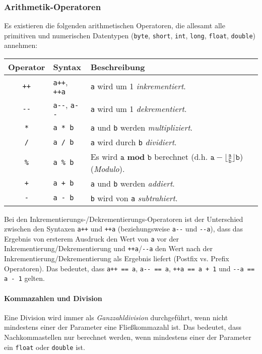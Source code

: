 	\subsubsection{Arithmetik-Operatoren}
		Es existieren die folgenden arithmetischen Operatoren, die allesamt alle primitiven und numerischen Datentypen (\lstinline|byte|, \lstinline|short|, \lstinline|int|, \lstinline|long|, \lstinline|float|, \lstinline|double|) annehmen:
		\begin{table}[H]
			\centering
			\begin{tabular}{c | l | l}
				\textbf{Operator} & \textbf{Syntax}                & \textbf{Beschreibung}                                    \\ \hline
				\texttt{++}       & \texttt{a++}, \texttt{++a}     & \texttt{a} wird um 1 \textit{inkrementiert}.             \\
				\texttt{-{}-}     & \texttt{a-{}-}, \texttt{a-{}-} & \texttt{a} wird um 1 \textit{dekrementiert}.             \\
				\texttt{*}        & \texttt{a * b}                 & \texttt{a} und \texttt{b} werden \textit{multipliziert}. \\
				\texttt{/}        & \texttt{a / b}                 & \texttt{a} wird durch \texttt{b} \textit{dividiert}.     \\
				\texttt{\%}       & \texttt{a \% b}                & Es wird \( \texttt{a} \textbf{ mod } \texttt{b} \) berechnet (d.h. \( \texttt{a} - \big\lfloor \frac{\texttt{a}}{\texttt{b}} \big\rfloor \texttt{b} \)) (\textit{Modulo}). \\
				\texttt{+}        & \texttt{a + b}                 & \texttt{a} und \texttt{b} werden \textit{addiert}.       \\
				\texttt{-}        & \texttt{a - b}                 & \texttt{b} wird von \texttt{a} \textit{subtrahiert}.
			\end{tabular}
		\end{table}
		Bei den Inkrementierungs-/Dekrementierungs-Operatoren ist der Unterschied zwischen den Syntaxen \texttt{a++} und \texttt{++a} (beziehungsweise \texttt{a-{}-} und \texttt{-{}-a}), dass das Ergebnis von ersterem Ausdruck den Wert von \texttt{a} vor der Inkrementierung/Dekrementierung und \texttt{++a}/\texttt{-{}-a} den Wert nach der Inkrementierung/Dekrementierung als Ergebnis liefert (Postfix vs. Prefix Operatoren). Das bedeutet, dass \texttt{a++ == a}, \texttt{a-{}- == a}, \texttt{++a == a + 1} und \texttt{-{}-a == a - 1} gelten.
		
		\paragraph{Kommazahlen und Division}
			Eine Division wird immer als \textit{Ganzzahldivision} durchgeführt, wenn nicht mindestens einer der Parameter eine Fließkommazahl ist. Das bedeutet, dass Nachkommastellen nur berechnet werden, wenn mindestens einer der Parameter ein \lstinline|float| oder \lstinline|double| ist.
			
